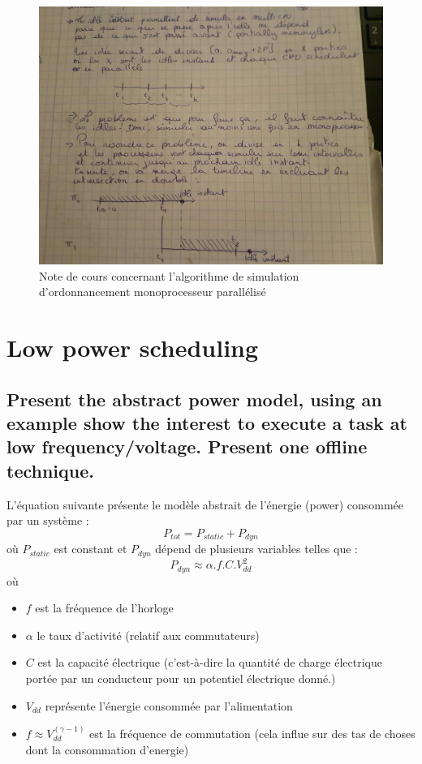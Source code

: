 \begin{figure}[H]
\centering
\includegraphics[width=\textwidth]{img_5_3__0}
\caption{Note de cours concernant l'algorithme de simulation d'ordonnancement monoprocesseur parallélisé}
\end{figure}

\newpage
\section{Low power scheduling}
\subsection{Present the abstract power model, using an example show the interest to execute a task at low frequency/voltage. Present one offline technique.}
L'équation suivante présente le modèle abstrait de l'énergie (power) consommée par un système  :
\begin{equation*}
P_{tot} = P_{static} + P_{dyn}
\end{equation*}
où $P_{static}$ est constant et $P_{dyn}$ dépend de plusieurs variables telles que :
\begin{equation*}
P_{dyn} \approx \alpha . f . C . V_{dd}^2
\end{equation*}
où 
\begin{itemize}
\item $f$ est la fréquence de l'horloge
\item $\alpha$ le taux d'activité (relatif aux commutateurs)
\item $C$ est la capacité électrique (c'est-à-dire la quantité de charge électrique portée par un conducteur pour un potentiel électrique donné.)
\item $V_{dd}$ représente l'énergie consommée par l'alimentation
\item $f \approx V_{dd}^{(\gamma -1)}$	est la fréquence de commutation (cela influe sur des tas de choses dont la consommation d'energie)
\end{itemize}
